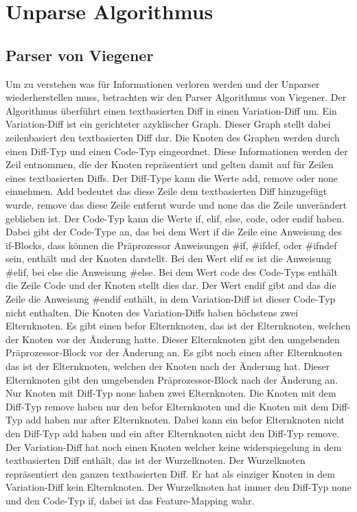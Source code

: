 \chapter{Unparse Algorithmus}
\section{Parser von Viegener}

Um zu verstehen was für Informationen verloren werden und der Unparser wiederherstellen muss, betrachten wir den Parser Algorithmus von Viegener. Der Algorithmus überführt einen textbasierten Diff in einen Variation-Diff um. Ein Variation-Diff ist ein gerichteter azyklischer Graph. Dieser Graph stellt dabei zeilenbasiert den textbasierten Diff dar. Die Knoten des Graphen werden durch einen Diff-Typ und einen Code-Typ eingeordnet. Diese Informationen werden der Zeil entnommen, die der Knoten repräsentiert und gelten damit auf für Zeilen eines textbasierten Diffs. Der Diff-Type kann die Werte add, remove oder none einnehmen. Add bedeutet das diese Zeile dem textbasierten Diff hinzugefügt wurde, remove das diese Zeile entfernt wurde und none das die Zeile unverändert geblieben ist. Der Code-Typ kann die Werte if, elif, else, code, oder endif haben. Dabei gibt der Code-Type an, das bei dem Wert if die Zeile eine Anweisung des if-Blocks, dass können die Präprozessor Anweisungen \#if, \#ifdef, oder \#ifndef sein, enthält und der Knoten darstellt. Bei den Wert elif es ist die Anweisung \#elif, bei else die Anweisung \#else. Bei dem Wert code des Code-Typs enthält die Zeile Code und der Knoten stellt dies dar. Der Wert endif gibt and das die Zeile die Anweisung \#endif enthält, in dem Variation-Diff ist dieser Code-Typ nicht enthalten. Die Knoten des Variation-Diffs haben höchstens zwei Elternknoten. Es gibt einen befor Elternknoten, das ist der Elternknoten, welchen der Knoten vor der Änderung hatte. Dieser Elternknoten gibt den umgebenden Präprozessor-Block vor der Änderung an. Es gibt noch einen after Elternknoten das ist der Elternknoten, welchen der Knoten nach der Änderung hat. Dieser Elternknoten gibt den umgebenden Präprozessor-Block nach der Änderung an. Nur Knoten mit Diff-Typ none haben zwei Elternknoten. Die Knoten mit dem Diff-Typ remove haben nur den befor Elternknoten und die Knoten mit dem Diff-Typ add haben nur after Elternknoten. Dabei kann ein befor Elternknoten nicht den Diff-Typ add haben und ein after Elternknoten nicht den Diff-Typ remove. Der Variation-Diff hat noch einen Knoten welcher keine widerspiegelung in dem textbasierten Diff enthält, das ist der Wurzelknoten. Der Wurzelknoten repräsentiert den ganzen textbasierten Diff. Er hat als einziger Knoten in dem Variation-Diff kein Elternknoten. Der Wurzelknoten hat immer den Diff-Typ none und den Code-Typ if, dabei ist das Feature-Mapping wahr.



